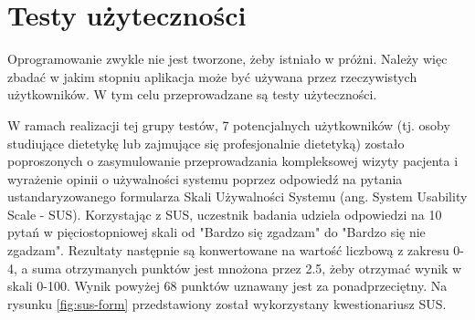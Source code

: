 
\section{Testy użyteczności}

Oprogramowanie zwykle nie jest tworzone, żeby istniało w próżni.
Należy więc zbadać w jakim stopniu aplikacja może być używana przez rzeczywistych użytkowników.
W tym celu przeprowadzane są testy użyteczności\cite{book:testowanie-i-jakosc-oprogramowania}.

\par
W ramach realizacji tej grupy testów, 7 potencjalnych użytkowników (tj. osoby studiujące dietetykę lub zajmujące się profesjonalnie dietetyką)
zostało poproszonych o zasymulowanie przeprowadzania kompleksowej wizyty pacjenta
i wyrażenie opinii o używalności systemu poprzez odpowiedź na pytania ustandaryzowanego formularza Skali Używalności Systemu (ang. System Usability Scale - SUS)\cite{url:sus}.
Korzystając z SUS, uczestnik badania udziela odpowiedzi na 10 pytań w pięciostopniowej skali od "Bardzo się zgadzam" do "Bardzo się nie zgadzam".
Rezultaty następnie są konwertowane na wartość liczbową z zakresu 0-4, a suma otrzymanych punktów jest mnożona przez 2.5, żeby otrzymać wynik w skali 0-100.
Wynik powyżej 68 punktów uznawany jest za ponadprzeciętny.
Na rysunku \ref{fig:sus-form} przedstawiony został wykorzystany kwestionariusz SUS.



\thispagestyle{normal}
